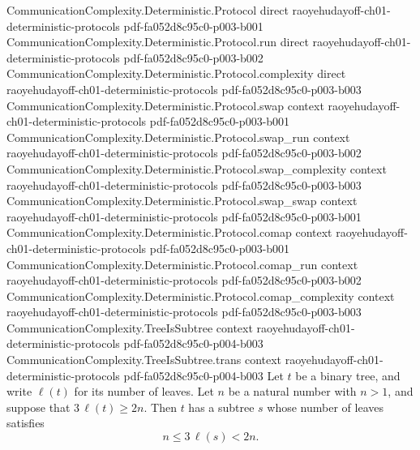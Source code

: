 \begin{lemma}
\label{CommunicationComplexity.tree_balanced_subtree_aux}
\leanok
{}
\proofstep
  {CommunicationComplexity.Deterministic.Protocol}
  {direct}
  {raoyehudayoff-ch01-deterministic-protocols}
  {pdf-fa052d8c95c0-p003-b001}
\proofstep
  {CommunicationComplexity.Deterministic.Protocol.run}
  {direct}
  {raoyehudayoff-ch01-deterministic-protocols}
  {pdf-fa052d8c95c0-p003-b002}
\proofstep
  {CommunicationComplexity.Deterministic.Protocol.complexity}
  {direct}
  {raoyehudayoff-ch01-deterministic-protocols}
  {pdf-fa052d8c95c0-p003-b003}
\proofstep
  {CommunicationComplexity.Deterministic.Protocol.swap}
  {context}
  {raoyehudayoff-ch01-deterministic-protocols}
  {pdf-fa052d8c95c0-p003-b001}
\proofstep
  {CommunicationComplexity.Deterministic.Protocol.swap_run}
  {context}
  {raoyehudayoff-ch01-deterministic-protocols}
  {pdf-fa052d8c95c0-p003-b002}
\proofstep
  {CommunicationComplexity.Deterministic.Protocol.swap_complexity}
  {context}
  {raoyehudayoff-ch01-deterministic-protocols}
  {pdf-fa052d8c95c0-p003-b003}
\proofstep
  {CommunicationComplexity.Deterministic.Protocol.swap_swap}
  {context}
  {raoyehudayoff-ch01-deterministic-protocols}
  {pdf-fa052d8c95c0-p003-b001}
\proofstep
  {CommunicationComplexity.Deterministic.Protocol.comap}
  {context}
  {raoyehudayoff-ch01-deterministic-protocols}
  {pdf-fa052d8c95c0-p003-b001}
\proofstep
  {CommunicationComplexity.Deterministic.Protocol.comap_run}
  {context}
  {raoyehudayoff-ch01-deterministic-protocols}
  {pdf-fa052d8c95c0-p003-b002}
\proofstep
  {CommunicationComplexity.Deterministic.Protocol.comap_complexity}
  {context}
  {raoyehudayoff-ch01-deterministic-protocols}
  {pdf-fa052d8c95c0-p003-b003}
\proofstep
  {CommunicationComplexity.TreeIsSubtree}
  {context}
  {raoyehudayoff-ch01-deterministic-protocols}
  {pdf-fa052d8c95c0-p004-b003}
\proofstep
  {CommunicationComplexity.TreeIsSubtree.trans}
  {context}
  {raoyehudayoff-ch01-deterministic-protocols}
  {pdf-fa052d8c95c0-p004-b003}
Let $t$ be a binary tree, and write $\ell(t)$ for its number of leaves. Let $n$ be a
natural number with $n > 1$, and suppose that $3\,\ell(t) \ge 2n$. Then $t$ has a
subtree $s$ whose number of leaves satisfies
\[
n \le 3\,\ell(s) < 2n.
\]
\end{lemma}

